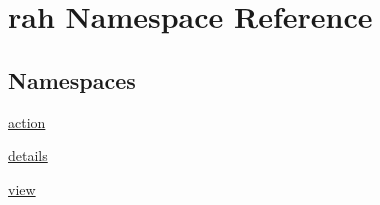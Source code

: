 \hypertarget{namespacerah}{}\section{rah Namespace Reference}
\label{namespacerah}
\subsection*{Namespaces}
\begin{DoxyCompactItemize}
\item 
 \mbox{\hyperlink{namespacerah_1_1action}{action}}
\item 
 \mbox{\hyperlink{namespacerah_1_1details}{details}}
\item 
 \mbox{\hyperlink{namespacerah_1_1view}{view}}
\end{DoxyCompactItemize}
